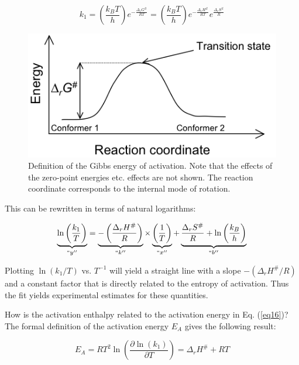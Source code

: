 \documentclass[byrevtex,amssymb,aps,pra,floatfix,letterpaper]{revtex4}
\begin{document}
\begin{equation}
k_1 = \left(\frac{k_BT}{h}\right)e^{-\frac{\Delta_rG^\#}{RT}} = 
\left(\frac{k_BT}{h}\right)e^{-\frac{\Delta_rH^\#}{RT}}e^{\frac{\Delta_rS^\#}{R}}
\label{eq18}
\end{equation}

\begin{figure}[!htp]
\begin{center}
\includegraphics[scale=0.5]{fig8}
\caption{Definition of the Gibbs energy of activation. Note that the effects of the zero-point energies etc. effects are not shown. The reaction coordinate corresponds to the internal mode of rotation.}
\label{fig8}
\end{center}
\end{figure}

\noindent
This can be rewritten in terms of natural logarithms:

\begin{equation}
\underbrace{\ln\left(\frac{k_1}{T}\right)}_{``y''} = \underbrace{-\left(\frac{\Delta_rH^\#}{R}\right)}_{``k''}\times\underbrace{\left(\frac{1}{T}\right)}_{``x''} + \underbrace{\frac{\Delta_rS^\#}{R} + \ln\left(\frac{k_B}{h}\right)}_{``b''}
\label{eq19}
\end{equation}

\noindent
Plotting $\ln(k_1 / T)$ vs. $T^{-1}$ will yield a straight line with a slope $-(\Delta_rH^\# / R)$ and a constant factor that is directly related to the entropy of activation. Thus the fit yields experimental estimates for these quantities.

How is the activation enthalpy related to the activation energy in Eq. (\ref{eq16})? The formal definition of the activation energy $E_A$ gives the following result:

\begin{equation}
E_A = RT^2\ln\left(\frac{\partial\ln(k_1)}{\partial T}\right) = \Delta_rH^\# + RT
\label{eq20}
\end{equation}
\end{document}
